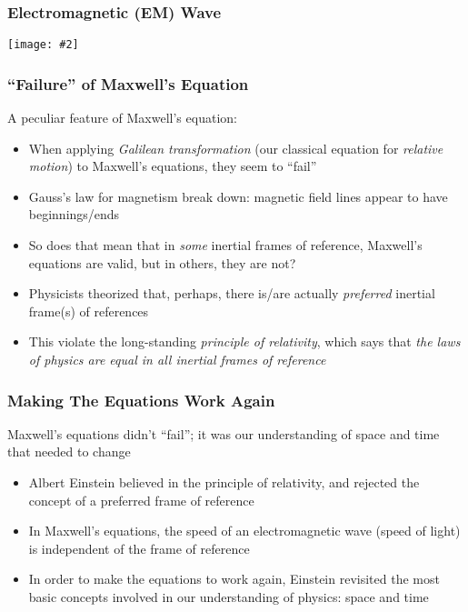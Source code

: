 \documentclass[12pt,aspectratio=169]{beamer}
\newcommand{\pic}[2]{\texttt{[image: \#2]}}\newcommand{\mb}[1]{\mathbf{#1}}
\begin{document}
\begin{frame}
  \frametitle{Electromagnetic (EM) Wave}

  \begin{center}
    \pic{.5}{em-20field.jpg}
  \end{center}
\end{frame}


\begin{frame}
  \frametitle{``Failure'' of Maxwell's Equation}
  A peculiar feature of Maxwell's equation:
  \begin{itemize}
  \item When applying \emph{Galilean transformation} (our classical equation for
    \emph{relative motion}) to Maxwell's equations, they seem to ``fail''
  \item Gauss's law for magnetism break down: magnetic field lines appear to
    have beginnings/ends
  \item So does that mean that in \emph{some} inertial frames of reference,
    Maxwell's equations are valid, but in others, they are not?
  \item Physicists theorized that, perhaps, there is/are actually
    \emph{preferred} inertial frame(s) of references
  \item This violate the long-standing
    \emph{principle of relativity}, which says that
    \emph{the laws of physics are equal in all inertial frames of reference}
  \end{itemize}
\end{frame}


\begin{frame}
  \frametitle{Making The Equations Work Again}
  Maxwell's equations didn't ``fail''; it was our understanding of space and
  time that needed to change
  \begin{itemize}
  \item Albert Einstein believed in the principle of relativity, and rejected
    the concept of a preferred frame of reference
  \item In Maxwell's equations, the speed of an electromagnetic wave (speed of
    light) is independent of the frame of reference
  \item In order to make the equations to work again, Einstein revisited the
    most basic concepts involved in our understanding of physics: space and
    time
  \end{itemize}
\end{frame}
\end{document}
